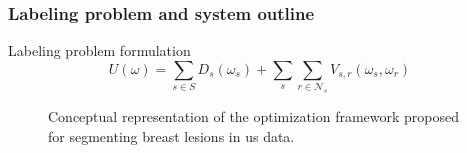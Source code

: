 \begin{frame}\frametitle{Labeling problem and system outline}
\vspace{-5pt}
\begin{small}
\begin{block}{Labeling problem formulation}
\begin{equation*}
U(\omega) = \sum_{s\in S} D_s(\omega_s) + \sum_{s}\sum_{r \in \mathcal{N}_{s}} V_{s,r}(\omega_s,\omega_r)
\end{equation*} 
\end{block}
\end{small}
\vspace{-5pt}
\begin{figure}[htbp]
\setlength{\abovecaptionskip}{2pt}
\centering
\begin{scriptsize}

\end{scriptsize}
\caption{Conceptual representation of the optimization framework proposed for segmenting breast lesions in \ac{us} data.}
\end{figure}
\end{frame}



